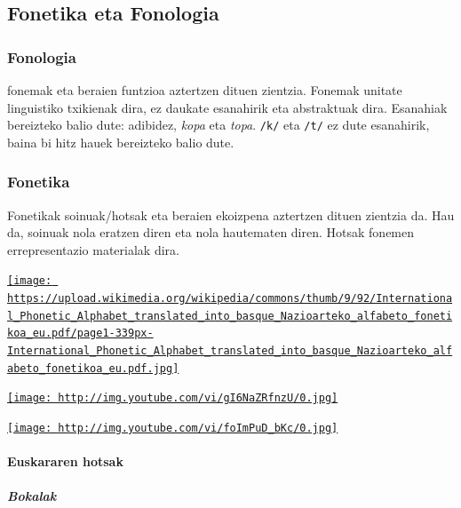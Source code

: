 \documentclass[
]{book}
\begin{document}
\hypertarget{fonetika-eta-fonologia}{%
\subsection{Fonetika eta Fonologia}\label{fonetika-eta-fonologia}}

\hypertarget{fonologia}{%
\subsubsection{Fonologia}\label{fonologia}}

fonemak eta beraien funtzioa aztertzen dituen zientzia. Fonemak unitate linguistiko txikienak dira, ez daukate esanahirik eta abstraktuak dira.
Esanahiak bereizteko balio dute: adibidez, \emph{kopa} eta \emph{topa}. \texttt{/k/} eta \texttt{/t/} ez dute esanahirik, baina bi hitz hauek bereizteko balio dute.

\hypertarget{fonetika}{%
\subsubsection{Fonetika}\label{fonetika}}

Fonetikak soinuak/hotsak eta beraien ekoizpena aztertzen dituen zientzia da. Hau da, soinuak nola eratzen diren eta nola hautematen diren.
Hotsak fonemen errepresentazio materialak dira.

\href{https://upload.wikimedia.org/wikipedia/commons/9/92/International_Phonetic_Alphabet_translated_into_basque_Nazioarteko_alfabeto_fonetikoa_eu.pdf}{\texttt{[image: https://upload.wikimedia.org/wikipedia/commons/thumb/9/92/International\_Phonetic\_Alphabet\_translated\_into\_basque\_Nazioarteko\_alfabeto\_fonetikoa\_eu.pdf/page1-339px-International\_Phonetic\_Alphabet\_translated\_into\_basque\_Nazioarteko\_alfabeto\_fonetikoa\_eu.pdf.jpg]}}

\href{http://www.youtube.com/watch?v=gI6NaZRfnzU}{\texttt{[image: http://img.youtube.com/vi/gI6NaZRfnzU/0.jpg]}}

\href{http://www.youtube.com/watch?v=foImPuD_bKc}{\texttt{[image: http://img.youtube.com/vi/foImPuD\_bKc/0.jpg]}}

\hypertarget{euskararen-hotsak}{%
\paragraph{Euskararen hotsak}\label{euskararen-hotsak}}

\hypertarget{bokalak}{%
\subparagraph{Bokalak}\label{bokalak}}
\end{document}
